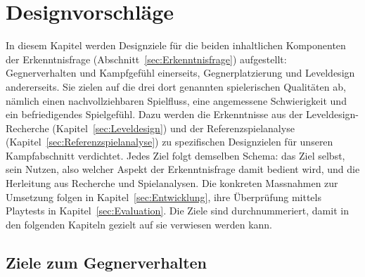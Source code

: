 \documentclass[../Main.tex]{subfiles}
\begin{document}
\section{Designvorschläge} \label{sec:Designziele}

In diesem Kapitel werden Designziele für die beiden inhaltlichen Komponenten der Erkenntnisfrage (Abschnitt~\ref{sec:Erkenntnisfrage}) aufgestellt: Gegnerverhalten und Kampfgefühl einerseits, Gegnerplatzierung und Leveldesign andererseits. Sie zielen auf die drei dort genannten spielerischen Qualitäten ab, nämlich einen nachvollziehbaren Spielfluss, eine angemessene Schwierigkeit und ein befriedigendes Spielgefühl. Dazu werden die Erkenntnisse aus der Leveldesign-Recherche (Kapitel~\ref{sec:Leveldesign}) und der Referenzspielanalyse (Kapitel~\ref{sec:Referenzspielanalyse}) zu spezifischen Designzielen für unseren Kampfabschnitt verdichtet. Jedes Ziel folgt demselben Schema: das Ziel selbst, sein Nutzen, also welcher Aspekt der Erkenntnisfrage damit bedient wird, und die Herleitung aus Recherche und Spielanalysen. Die konkreten Massnahmen zur Umsetzung folgen in Kapitel~\ref{sec:Entwicklung}, ihre Überprüfung mittels Playtests in Kapitel~\ref{sec:Evaluation}. Die Ziele sind durchnummeriert, damit in den folgenden Kapiteln gezielt auf sie verwiesen werden kann.

\subsection{Ziele zum Gegnerverhalten}
\end{document}
